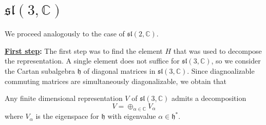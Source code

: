 \documentclass{report}
\begin{document}
\section{$\mathfrak{sl}(3, \mathbb C)$}
We proceed analogously to the case of $\mathfrak{sl}(2, \mathbb C)$.

{\bf \underline{First step}:}
The first step was to find the element $H$ that was used to decompose the representation.
A single element does not suffice for $\mathfrak{sl}(3, \mathbb C)$, so we consider the Cartan subalgebra $\mathfrak h$ of diagonal matrices in $\mathfrak{sl}(3, \mathbb C)$.
Since diagnoalizable commuting matrices are simultaneously diagonalizable, we obtain that
\begin{center}
    Any finite dimensional representation $V$ of $\mathfrak{sl}(3, \mathbb C)$ admits a decomposition $$V = \oplus_{\alpha \in \mathbb C} V_\alpha$$ where $V_\alpha$ is the eigenspace for $\mathfrak h$ with eigenvalue $\alpha \in \mathfrak h^*$.
\end{center}
\end{document}
